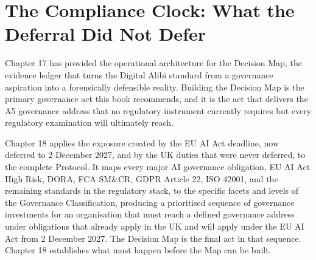\scenebreak

\section{The Compliance Clock: What the Deferral Did Not Defer}

Chapter 17 has provided the operational architecture for the Decision Map, the evidence ledger that turns the Digital Alibi standard from a governance aspiration into a forensically defensible reality. Building the Decision Map is the primary governance act this book recommends, and it is the act that delivers the A5 governance address that no regulatory instrument currently requires but every regulatory examination will ultimately reach.

Chapter 18 applies the exposure created by the EU AI Act deadline, now deferred to 2 December 2027, and by the UK duties that were never deferred, to the complete Protocol. It maps every major AI governance obligation, EU AI Act High Risk, DORA, FCA SM\&CR, GDPR Article 22, ISO 42001, and the remaining standards in the regulatory stack, to the specific facets and levels of the Governance Classification, producing a prioritised sequence of governance investments for an organisation that must reach a defined governance address under obligations that already apply in the UK and will apply under the EU AI Act from 2 December 2027. The Decision Map is the final act in that sequence. Chapter 18 establishes what must happen before the Map can be built.
